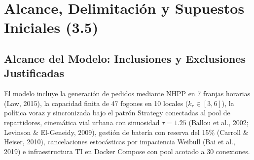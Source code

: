 \documentclass[11pt,letterpaper]{article}
\begin{document}
\section{Alcance, Delimitación y Supuestos Iniciales (3.5)}

\subsection{Alcance del Modelo: Inclusiones y Exclusiones Justificadas}
El modelo incluye la generación de pedidos mediante NHPP en 7 franjas horarias (Law, 2015), la capacidad finita de 47 fogones en 10 locales ($k_r \in [3, 6]$), la política voraz y sincronizada bajo el patrón Strategy conectadas al pool de repartidores, cinemática vial urbana con sinuosidad $\tau = 1.25$ (Ballou et al., 2002; Levinson \& El-Geneidy, 2009), gestión de batería con reserva del 15\% (Carroll \& Heiser, 2010), cancelaciones estocásticas por impaciencia Weibull (Bai et al., 2019) e infraestructura TI en Docker Compose con pool acotado a 30 conexiones.
\end{document}
